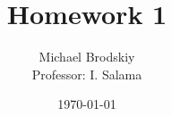 


\title{Homework 1}
\date{\today}
\author{Michael Brodskiy\\ \small Professor: I. Salama}



\maketitle

